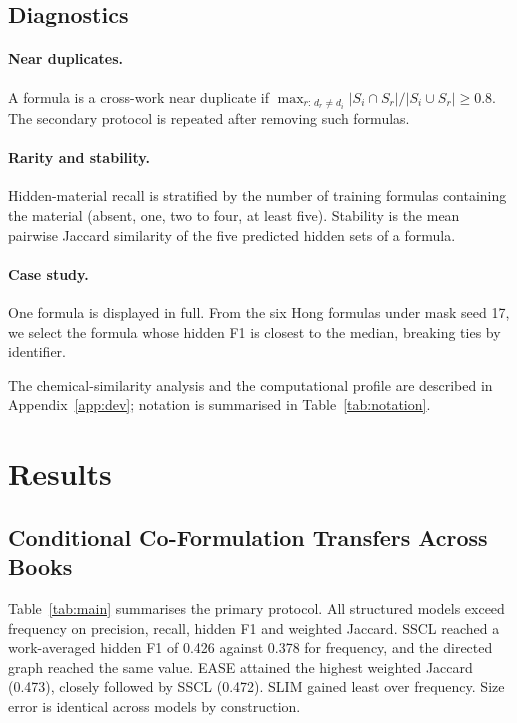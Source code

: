 \documentclass[applsci,article,submit,oneauthor]{Definitions/mdpi}
\begin{document}
\subsection{Diagnostics}
\label{sec:diagnostics}

\paragraph{Near duplicates.} A formula is a cross-work near duplicate if $\max_{r:\,d_r\ne d_i}|S_i\cap S_r|/|S_i\cup S_r|\ge0.8$. The secondary protocol is repeated after removing such formulas.

\paragraph{Rarity and stability.} Hidden-material recall is stratified by the number of training formulas containing the material (absent, one, two to four, at least five). Stability is the mean pairwise Jaccard similarity of the five predicted hidden sets of a formula.

\paragraph{Case study.} One formula is displayed in full. From the six Hong formulas under mask seed 17, we select the formula whose hidden F1 is closest to the median, breaking ties by identifier.

The chemical-similarity analysis and the computational profile are described in Appendix~\ref{app:dev}; notation is summarised in Table~\ref{tab:notation}.

\section{Results}
\label{sec:results}

\subsection{Conditional Co-Formulation Transfers Across Books}
\label{sec:main}

Table~\ref{tab:main} summarises the primary protocol. All structured models exceed frequency on precision, recall, hidden F1 and weighted Jaccard. SSCL reached a work-averaged hidden F1 of 0.426 against 0.378 for frequency, and the directed graph reached the same value. EASE attained the highest weighted Jaccard (0.473), closely followed by SSCL (0.472). SLIM gained least over frequency. Size error is identical across models by construction.
\end{document}
